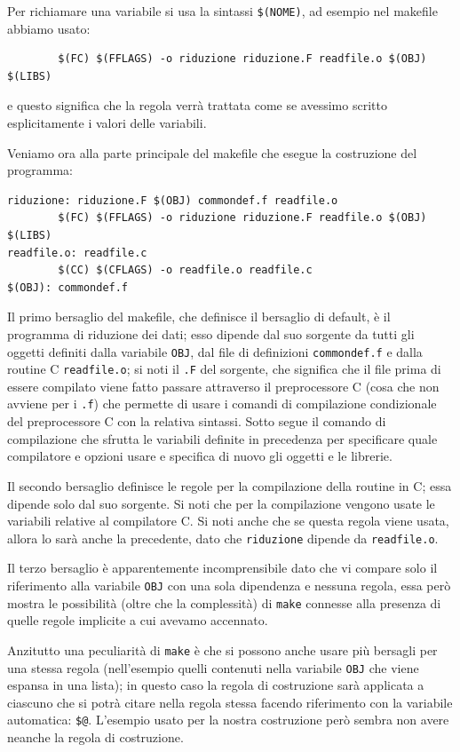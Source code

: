 Per richiamare una variabile si usa la sintassi \texttt{\$(NOME)}, ad esempio
nel makefile abbiamo usato:
\begin{verbatim}
        $(FC) $(FFLAGS) -o riduzione riduzione.F readfile.o $(OBJ) $(LIBS) 
\end{verbatim}
e questo significa che la regola verrà trattata come se avessimo scritto 
esplicitamente i valori delle variabili.

Veniamo ora alla parte principale del makefile che esegue la costruzione del
programma:
\begin{verbatim}
riduzione: riduzione.F $(OBJ) commondef.f readfile.o
        $(FC) $(FFLAGS) -o riduzione riduzione.F readfile.o $(OBJ) $(LIBS) 
readfile.o: readfile.c
        $(CC) $(CFLAGS) -o readfile.o readfile.c
$(OBJ): commondef.f
\end{verbatim}

Il primo bersaglio del makefile, che definisce il bersaglio di default, è il
programma di riduzione dei dati; esso dipende dal suo sorgente da tutti gli
oggetti definiti dalla variabile \texttt{OBJ}, dal file di definizioni
\texttt{commondef.f} e dalla routine C \texttt{readfile.o}; si noti il
\texttt{.F} del sorgente, che significa che il file prima di essere compilato
viene fatto passare attraverso il preprocessore C (cosa che non avviene per i
\texttt{.f}) che permette di usare i comandi di compilazione condizionale del
preprocessore C con la relativa sintassi. Sotto segue il comando di
compilazione che sfrutta le variabili definite in precedenza per specificare
quale compilatore e opzioni usare e specifica di nuovo gli oggetti e le
librerie.

Il secondo bersaglio definisce le regole per la compilazione della routine
in C; essa dipende solo dal suo sorgente. Si noti che per la compilazione
vengono usate le variabili relative al compilatore C. Si noti anche che se
questa regola viene usata, allora lo sarà anche la precedente, dato che
\texttt{riduzione} dipende da \texttt{readfile.o}.

Il terzo bersaglio è apparentemente incomprensibile dato che vi compare
solo il riferimento alla variabile \texttt{OBJ} con una sola dipendenza e
nessuna regola, essa però mostra le possibilità (oltre che la
complessità) di \texttt{make} connesse alla presenza di quelle regole
implicite a cui avevamo accennato.

Anzitutto una peculiarità di \texttt{make} è che si possono anche usare più
bersagli per una stessa regola (nell'esempio quelli contenuti nella variabile
\texttt{OBJ} che viene espansa in una lista); in questo caso la regola di
costruzione sarà applicata a ciascuno che si potrà citare nella regola stessa
facendo riferimento con la variabile automatica: \texttt{\$@}.  L'esempio
usato per la nostra costruzione però sembra non avere neanche la regola di
costruzione.


